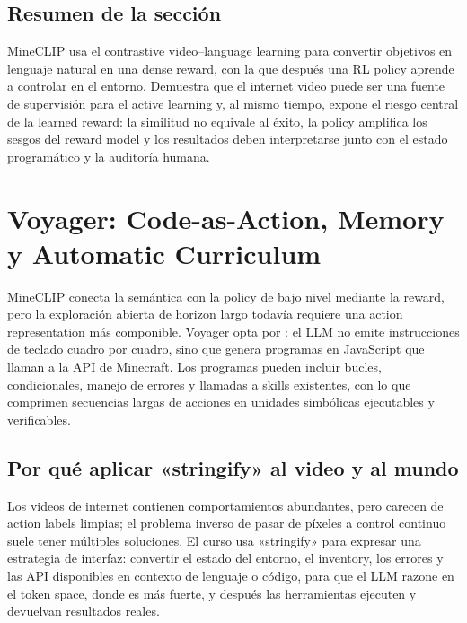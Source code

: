 \documentclass[a4paper]{article}
\begin{document}

\subsection{Resumen de la sección}

MineCLIP usa el contrastive video--language learning para convertir objetivos en lenguaje natural en una dense reward, con la que después una RL policy aprende a controlar en el entorno. Demuestra que el internet video puede ser una fuente de supervisión para el active learning y, al mismo tiempo, expone el riesgo central de la learned reward: la similitud no equivale al éxito, la policy amplifica los sesgos del reward model y los resultados deben interpretarse junto con el estado programático y la auditoría humana.
\section{Voyager: Code-as-Action, Memory y Automatic Curriculum}

MineCLIP conecta la semántica con la policy de bajo nivel mediante la reward, pero la exploración abierta de horizon largo todavía requiere una action representation más componible. Voyager opta por : el LLM no emite instrucciones de teclado cuadro por cuadro, sino que genera programas en JavaScript que llaman a la API de Minecraft. Los programas pueden incluir bucles, condicionales, manejo de errores y llamadas a skills existentes, con lo que comprimen secuencias largas de acciones en unidades simbólicas ejecutables y verificables.

\subsection{Por qué aplicar «stringify» al video y al mundo}

Los videos de internet contienen comportamientos abundantes, pero carecen de action labels limpias; el problema inverso de pasar de píxeles a control continuo suele tener múltiples soluciones. El curso usa «stringify» para expresar una estrategia de interfaz: convertir el estado del entorno, el inventory, los errores y las API disponibles en contexto de lenguaje o código, para que el LLM razone en el token space, donde es más fuerte, y después las herramientas ejecuten y devuelvan resultados reales.
\end{document}

